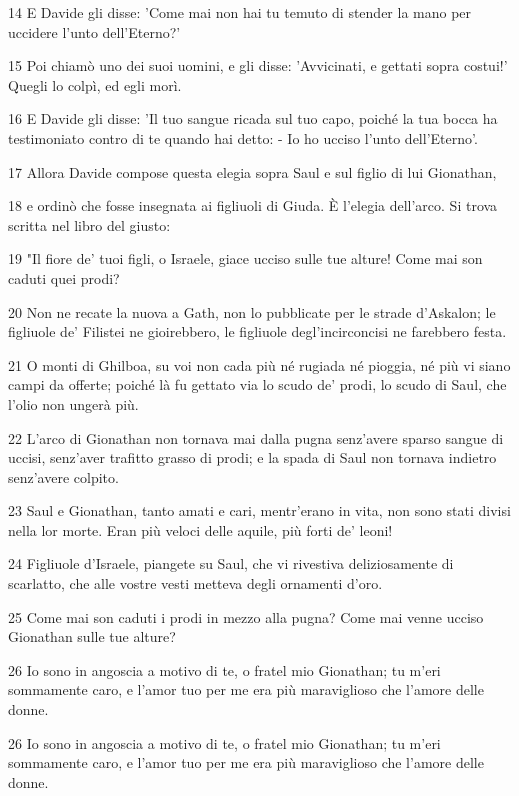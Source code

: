\par 14 E Davide gli disse: 'Come mai non hai tu temuto di stender la mano per uccidere l'unto dell'Eterno?'
\par 15 Poi chiamò uno dei suoi uomini, e gli disse: 'Avvicinati, e gettati sopra costui!' Quegli lo colpì, ed egli morì.
\par 16 E Davide gli disse: 'Il tuo sangue ricada sul tuo capo, poiché la tua bocca ha testimoniato contro di te quando hai detto: - Io ho ucciso l'unto dell'Eterno'.
\par 17 Allora Davide compose questa elegia sopra Saul e sul figlio di lui Gionathan,
\par 18 e ordinò che fosse insegnata ai figliuoli di Giuda. È l'elegia dell'arco. Si trova scritta nel libro del giusto:
\par 19 "Il fiore de' tuoi figli, o Israele, giace ucciso sulle tue alture! Come mai son caduti quei prodi?
\par 20 Non ne recate la nuova a Gath, non lo pubblicate per le strade d'Askalon; le figliuole de' Filistei ne gioirebbero, le figliuole degl'incirconcisi ne farebbero festa.
\par 21 O monti di Ghilboa, su voi non cada più né rugiada né pioggia, né più vi siano campi da offerte; poiché là fu gettato via lo scudo de' prodi, lo scudo di Saul, che l'olio non ungerà più.
\par 22 L'arco di Gionathan non tornava mai dalla pugna senz'avere sparso sangue di uccisi, senz'aver trafitto grasso di prodi; e la spada di Saul non tornava indietro senz'avere colpito.
\par 23 Saul e Gionathan, tanto amati e cari, mentr'erano in vita, non sono stati divisi nella lor morte. Eran più veloci delle aquile, più forti de' leoni!
\par 24 Figliuole d'Israele, piangete su Saul, che vi rivestiva deliziosamente di scarlatto, che alle vostre vesti metteva degli ornamenti d'oro.
\par 25 Come mai son caduti i prodi in mezzo alla pugna? Come mai venne ucciso Gionathan sulle tue alture?
\par 26 Io sono in angoscia a motivo di te, o fratel mio Gionathan; tu m'eri sommamente caro, e l'amor tuo per me era più maraviglioso che l'amore delle donne.
\par 26 Io sono in angoscia a motivo di te, o fratel mio Gionathan; tu m'eri sommamente caro, e l'amor tuo per me era più maraviglioso che l'amore delle donne.

